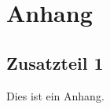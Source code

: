 \newpage
\appendix
\section{Anhang}

\subsection*{Zusatzteil 1} \label{anhang:zusatz1}

Dies ist ein Anhang.

\clearpage
